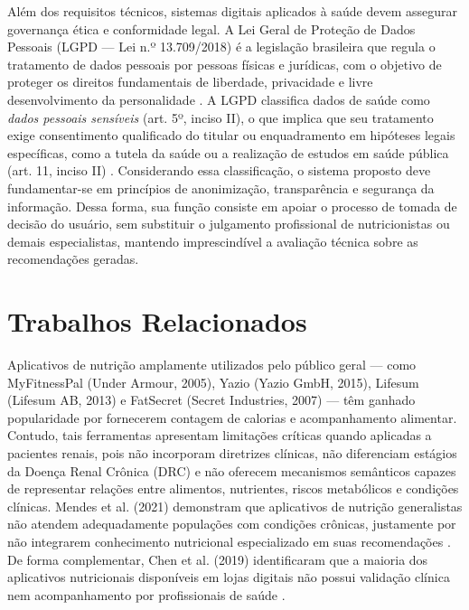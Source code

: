 \documentclass[12pt, a4paper, twocolumn]{article}
\begin{document}
Além dos requisitos técnicos, sistemas digitais aplicados à saúde devem assegurar governança ética e conformidade legal. A Lei Geral de Proteção de Dados Pessoais (LGPD --- Lei n.º 13.709/2018) é a legislação brasileira que regula o tratamento de dados pessoais por pessoas físicas e jurídicas, com o objetivo de proteger os direitos fundamentais de liberdade, privacidade e livre desenvolvimento da personalidade \cite{brasil2018}. A LGPD classifica dados de saúde como \textit{dados pessoais sensíveis} (art. 5º, inciso II), o que implica que seu tratamento exige consentimento qualificado do titular ou enquadramento em hipóteses legais específicas, como a tutela da saúde ou a realização de estudos em saúde pública (art. 11, inciso II) \cite{brasil2018,botelho2021}. Considerando essa classificação, o sistema proposto deve fundamentar-se em princípios de anonimização, transparência e segurança da informação. Dessa forma, sua função consiste em apoiar o processo de tomada de decisão do usuário, sem substituir o julgamento profissional de nutricionistas ou demais especialistas, mantendo imprescindível a avaliação técnica sobre as recomendações geradas.

\section{Trabalhos Relacionados}

Aplicativos de nutrição amplamente utilizados pelo público geral --- como MyFitnessPal (Under Armour, 2005), Yazio (Yazio GmbH, 2015), Lifesum (Lifesum AB, 2013) e FatSecret (Secret Industries, 2007) --- têm ganhado popularidade por fornecerem contagem de calorias e acompanhamento alimentar. Contudo, tais ferramentas apresentam limitações críticas quando aplicadas a pacientes renais, pois não incorporam diretrizes clínicas, não diferenciam estágios da Doença Renal Crônica (DRC) e não oferecem mecanismos semânticos capazes de representar relações entre alimentos, nutrientes, riscos metabólicos e condições clínicas. Mendes et al. (2021) demonstram que aplicativos de nutrição generalistas não atendem adequadamente populações com condições crônicas, justamente por não integrarem conhecimento nutricional especializado em suas recomendações \cite{mendes2021}. De forma complementar, Chen et al. (2019) identificaram que a maioria dos aplicativos nutricionais disponíveis em lojas digitais não possui validação clínica nem acompanhamento por profissionais de saúde \cite{chen2019}.
\end{document}
